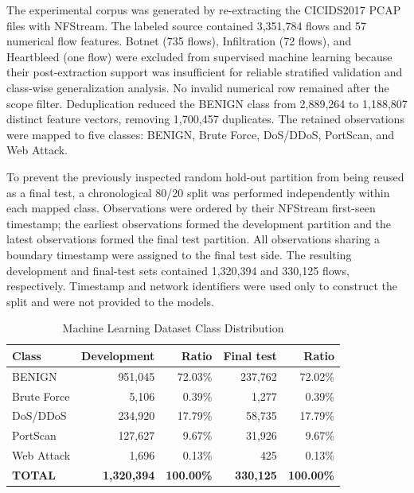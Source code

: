 
The experimental corpus was generated by re-extracting the CICIDS2017
PCAP files with NFStream. The labeled source contained 3,351,784 flows
and 57 numerical flow features. Botnet (735 flows), Infiltration (72
flows), and Heartbleed (one flow) were excluded from supervised machine
learning because their post-extraction support was insufficient for
reliable stratified validation and class-wise generalization analysis.
No invalid numerical row remained after the scope filter. Deduplication
reduced the BENIGN class from 2,889,264 to 1,188,807 distinct feature
vectors, removing 1,700,457 duplicates. The retained observations were
mapped to five classes: BENIGN, Brute Force, DoS/DDoS, PortScan, and Web
Attack.

To prevent the previously inspected random hold-out partition from being
reused as a final test, a chronological 80/20 split was performed
independently within each mapped class. Observations were ordered by
their NFStream first-seen timestamp; the earliest observations formed the
development partition and the latest observations formed the final test
partition. All observations sharing a boundary timestamp were assigned
to the final test side. The resulting development and final-test sets
contained 1,320,394 and 330,125 flows, respectively. Timestamp and
network identifiers were used only to construct the split and were not
provided to the models.

\begin{table}[H]
  \caption{Machine Learning Dataset Class Distribution}
  \centering
  \small
  \begin{tabularx}{\textwidth}{|X|r|r|r|r|}
    \hline
    \textbf{Class} & \textbf{Development} & \textbf{Ratio} & \textbf{Final test} & \textbf{Ratio} \\ \hline
    BENIGN & 951,045 & 72.03\% & 237,762 & 72.02\% \\ \hline
    Brute Force & 5,106 & 0.39\% & 1,277 & 0.39\% \\ \hline
    DoS/DDoS & 234,920 & 17.79\% & 58,735 & 17.79\% \\ \hline
    PortScan & 127,627 & 9.67\% & 31,926 & 9.67\% \\ \hline
    Web Attack & 1,696 & 0.13\% & 425 & 0.13\% \\ \hline
    \textbf{TOTAL} & \textbf{1,320,394} & \textbf{100.00\%} & \textbf{330,125} & \textbf{100.00\%} \\ \hline
  \end{tabularx}
\end{table}

